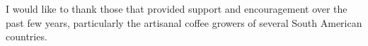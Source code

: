 I would like to thank those that provided support and encouragement over the past few years, particularly the artisanal coffee growers of several South American countries.